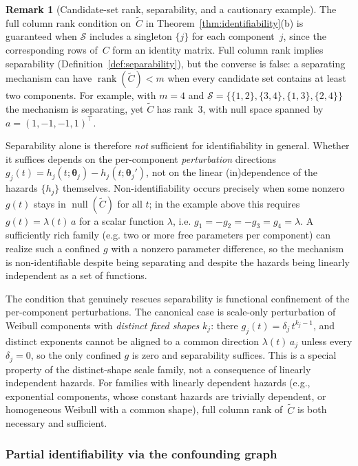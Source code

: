 \documentclass[11pt]{article}
\theoremstyle{definition}
\newtheorem{remark}{Remark}
\theoremstyle{plain}
\renewcommand{\v}[1]{\boldsymbol{#1}}
\begin{document}
\begin{remark}[Candidate-set rank, separability, and a cautionary example]
\label{rem:linear-independence}
The full column rank condition on~$\tilde{C}$ in
Theorem~\ref{thm:identifiability}(b) is guaranteed when
$\mathcal{S}$ includes a singleton $\{j\}$ for each
component~$j$, since the corresponding rows of~$C$ form an identity
matrix.
Full column rank implies separability
(Definition~\ref{def:separability}), but the converse is false: a
separating mechanism can have
$\operatorname{rank}(\tilde{C}) < m$ when every candidate set
contains at least two components. For example, with $m = 4$ and
$\mathcal{S} = \{\{1,2\}, \{3,4\}, \{1,3\}, \{2,4\}\}$ the
mechanism is separating, yet $\tilde{C}$ has rank~$3$, with null
space spanned by $a = (1, -1, -1, 1)^\top$.

Separability alone is therefore \emph{not} sufficient for
identifiability in general. Whether it suffices depends on the
per-component \emph{perturbation} directions $g_j(t) = h_j(t;
\v{\theta}_j) - h_j(t; \v{\theta}_j')$, not on the linear
(in)dependence of the hazards $\{h_j\}$ themselves. Non-identifiability
occurs precisely when some nonzero $g(t)$ stays in
$\operatorname{null}(\tilde{C})$ for all $t$; in the example above
this requires $g(t) = \lambda(t)\,a$ for a scalar function
$\lambda$, i.e. $g_1 = -g_2 = -g_3 = g_4 = \lambda$. A sufficiently
rich family (e.g. two or more free parameters per component) can
realize such a confined $g$ with a nonzero parameter difference,
so the mechanism is non-identifiable despite being separating and
despite the hazards being linearly independent as a set of
functions.

The condition that genuinely rescues separability is functional
confinement of the per-component perturbations. The canonical case
is scale-only perturbation of Weibull components with \emph{distinct
fixed shapes} $k_j$: there $g_j(t) = \delta_j\, t^{k_j - 1}$, and
distinct exponents cannot be aligned to a common direction
$\lambda(t)\,a_j$ unless every $\delta_j = 0$, so the only confined
$g$ is zero and separability suffices. This is a special property of
the distinct-shape scale family, not a consequence of linearly
independent hazards. For families with linearly dependent hazards
(e.g., exponential components, whose constant hazards are trivially
dependent, or homogeneous Weibull with a common shape), full column
rank of~$\tilde{C}$ is both necessary and sufficient.
\end{remark}

\subsubsection*{Partial identifiability via the confounding graph}
\end{document}
